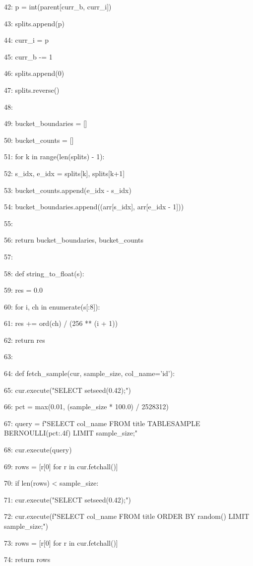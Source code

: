 \documentclass[11pt,a4paper]{article}
\begin{document}
42:         p = int(parent[curr\_b, curr\_i])

43:         splits.append(p)

44:         curr\_i = p

45:         curr\_b -= 1

46:     splits.append(0)

47:     splits.reverse()

48:

49:     bucket\_boundaries = []

50:     bucket\_counts = []

51:     for k in range(len(splits) - 1):

52:         s\_idx, e\_idx = splits[k], splits[k+1]

53:         bucket\_counts.append(e\_idx - s\_idx)

54:         bucket\_boundaries.append((arr[s\_idx], arr[e\_idx - 1]))

55:

56:     return bucket\_boundaries, bucket\_counts

57:

58: def string\_to\_float(s):

59:     res = 0.0

60:     for i, ch in enumerate(s[:8]):

61:         res += ord(ch) / (256 ** (i + 1))

62:     return res

63:

64: def fetch\_sample(cur, sample\_size, col\_name='id'):

65:     cur.execute("SELECT setseed(0.42);")

66:     pct = max(0.01, (sample\_size * 100.0) / 2528312)

67:     query = f"SELECT {col\_name} FROM title TABLESAMPLE BERNOULLI({pct:.4f}) LIMIT {sample\_size};"

68:     cur.execute(query)

69:     rows = [r[0] for r in cur.fetchall()]

70:     if len(rows) < sample\_size:

71:         cur.execute("SELECT setseed(0.42);")

72:         cur.execute(f"SELECT {col\_name} FROM title ORDER BY random() LIMIT {sample\_size};")

73:         rows = [r[0] for r in cur.fetchall()]

74:     return rows
\end{document}
